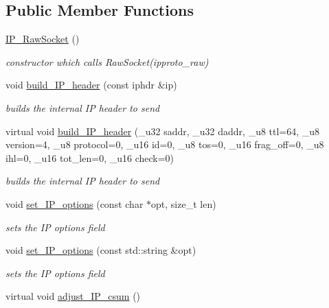 \subsection*{Public Member Functions}
\begin{CompactItemize}
\item 
\hypertarget{classsocketpp_1_1IP__RawSocket_e523748e7ca5bbcf7b74d804d356630e}{
\hyperlink{classsocketpp_1_1IP__RawSocket_e523748e7ca5bbcf7b74d804d356630e}{IP\_\-RawSocket} ()}
\label{classsocketpp_1_1IP__RawSocket_e523748e7ca5bbcf7b74d804d356630e}

\begin{CompactList}\small\item\em constructor which calls RawSocket(ipproto\_\-raw) \item\end{CompactList}\item 
void \hyperlink{classsocketpp_1_1IP__RawSocket_f93c51a7a8284fe9d2b24019b13a5803}{build\_\-IP\_\-header} (const iphdr \&ip)
\begin{CompactList}\small\item\em builds the internal IP header to send \item\end{CompactList}\item 
\hypertarget{classsocketpp_1_1IP__RawSocket_64e10d0fc07e687ebfeeeff45f29533e}{
virtual void \hyperlink{classsocketpp_1_1IP__RawSocket_64e10d0fc07e687ebfeeeff45f29533e}{build\_\-IP\_\-header} (\_\-u32 saddr, \_\-u32 daddr, \_\-u8 ttl=64, \_\-u8 version=4, \_\-u8 protocol=0, \_\-u16 id=0, \_\-u8 tos=0, \_\-u16 frag\_\-off=0, \_\-u8 ihl=0, \_\-u16 tot\_\-len=0, \_\-u16 check=0)}
\label{classsocketpp_1_1IP__RawSocket_64e10d0fc07e687ebfeeeff45f29533e}

\begin{CompactList}\small\item\em builds the internal IP header to send \item\end{CompactList}\item 
void \hyperlink{classsocketpp_1_1IP__RawSocket_82c0b2c75d081bc84d8e60bf18199e65}{set\_\-IP\_\-options} (const char $\ast$opt, size\_\-t len)
\begin{CompactList}\small\item\em sets the IP options field \item\end{CompactList}\item 
void \hyperlink{classsocketpp_1_1IP__RawSocket_9d88ecec5e362b3cf3d3dbc51d5dd0cd}{set\_\-IP\_\-options} (const std::string \&opt)
\begin{CompactList}\small\item\em sets the IP options field \item\end{CompactList}\item 
\hypertarget{classsocketpp_1_1IP__RawSocket_187bab79c6a8bae17b400a132063a9d1}{
virtual void \hyperlink{classsocketpp_1_1IP__RawSocket_187bab79c6a8bae17b400a132063a9d1}{adjust\_\-IP\_\-csum} ()}
\label{classsocketpp_1_1IP__RawSocket_187bab79c6a8bae17b400a132063a9d1}


\end{CompactItemize}
